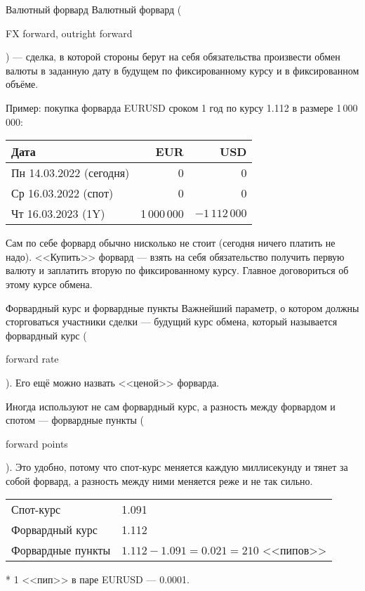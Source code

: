 \documentclass{beamer}
\newcommand{\en}[1]{\begin{otherlanguage}{english}#1\end{otherlanguage}}
\begin{document}
\begin{frame}{Валютный форвард}
\justify
\alert{Валютный форвард} (\en{FX forward, outright forward}) --- сделка, в которой стороны берут 
на себя обязательства произвести обмен валюты в заданную дату в будущем по 
фиксированному курсу и в фиксированном объёме. 

\justify
Пример: покупка форварда EURUSD сроком 1 год по курсу 1.112 в размере 1\,000\,000:

\centering
\begin{tabular}{l|r|r}
Дата                          & EUR & USD \\ \hline
Пн 14.03.2022 (сегодня)  & 0   & 0   \\
Ср 16.03.2022 (спот) & 0   & 0   \\
Чт 16.03.2023 (1Y)   & 1\,000\,000 & $-1\,112\,000$
\end{tabular}

\justify
Сам по себе форвард обычно нисколько не стоит (сегодня ничего платить не надо). <<Купить>> форвард --- взять на себя обязательство получить первую валюту и заплатить вторую по фиксированному курсу. Главное договориться об этому курсе обмена.
\end{frame}



\begin{frame}{Форвардный курс и форвардные пункты}
\justify
Важнейший параметр, о котором должны сторговаться участники сделки --- будущий курс обмена, который называется \alert{форвардный курс} (\en{forward rate}). Его ещё можно назвать <<ценой>> форварда.

\justify
Иногда используют не сам форвардный курс, а разность между форвардом и спотом --- \alert{форвардные пункты} (\en{forward points}). Это удобно, потому что спот-курс меняется каждую миллисекунду и тянет за собой форвард, а разность между ними меняется реже и не так сильно.

\vspace{\baselineskip}
\centering
\begin{tabular}{l|l}
Спот-курс & 1.091 \\
Форвардный курс & 1.112 \\
\hline
Форвардные пункты & $1.112 - 1.091 = 0.021 = 210$ <<пипов>>
\end{tabular}

\justify
* 1 <<пип>> в паре EURUSD --- 0.0001.
\end{frame}
\end{document}
